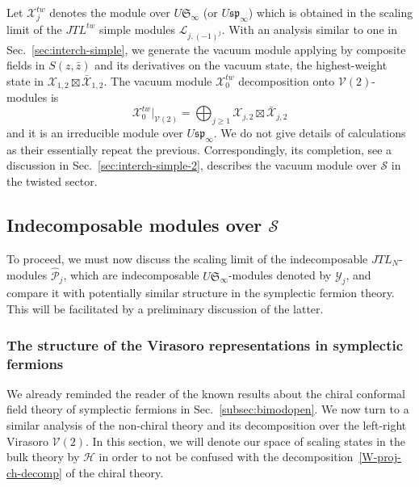 \documentclass[11pt]{article}
\newcommand{\JTL}[1]{JTL_{#1}}
\newcommand{\VirN}{\boldsymbol{\mathcal{V}}}
\newcommand{\interLie}{\mathfrak{S}}
\newcommand{\interchalg}{\mathcal{S}}
\newcommand{\spinf}{\ssp_{\infty}}
\newcommand{\interinfin}{\interLie_{\infty}}
\newcommand{\interM}[1]{\mathscr{X}_{#1}}
\newcommand{\interP}[1]{\mathscr{Y}_{#1}}
\newcommand{\ssp}{\mathfrak{sp}}
\newcommand{\bimnch}{\boldsymbol{\mathcal{H}}}
\newcommand{\bz}{\bar{z}}
\newcommand{\enrg}{S}
\newcommand{\VX}{\mathcal{X}}
\newcommand{\AIrrTL}[2]{\mathscr{L}_{#1,#2}}
\newcommand{\APrTL}[1]{\widehat{\mathscr{P}}_{#1}}
\theoremstyle{definition}
\begin{document}
Let $\interM{j}^{tw}$ denotes the module over
$U\interinfin$ (or $U\spinf$) which is obtained in the scaling limit of the $\JTL{}^{tw}$ simple modules $\AIrrTL{j}{(-1)^{j}}$. With an analysis similar to one in Sec.~\ref{sec:interch-simple}, we generate the vacuum module applying by composite fields in $\enrg(z,\bz)$ and its derivatives on the vacuum state, the highest-weight state in $\VX_{1,2}\boxtimes\bar{\VX}_{1,2}$.  The vacuum module $\interM{0}^{tw}$
 decomposition onto $\VirN(2)$-modules is
\begin{equation}\label{interch-vac-mod-tw}
\interM{0}^{tw}|_{\VirN(2)}  =  \bigoplus_{j\geq1} \VX_{j,2}\boxtimes\bar{\VX}_{j,2}
\end{equation}
and it is an irreducible module over $U\spinf$.
We do not give details of calculations as their essentially repeat the previous. Correspondingly, its completion, see a discussion in Sec.~\ref{sec:interch-simple-2}, describes the vacuum module over $\interchalg$ in the twisted sector.



\subsection{Indecomposable modules over $\interchalg$}\label{sec:indecompmod}

To proceed, we must now discuss the scaling limit of the
indecomposable $\JTL{N}$-modules $\APrTL{j}$, which are indecomposable $U\interinfin$-modules denoted by $\interP{j}$, and compare it with
potentially similar structure in the symplectic fermion theory. This
will be facilitated by a preliminary discussion of the latter.

\subsubsection{The structure of  the Virasoro representations in symplectic fermions}\label{sec:non-chiral-sympl-fer}


We already reminded the reader of the  known results about the chiral conformal
field theory of symplectic fermions in
Sec.~\ref{subsec:bimodopen}. We now turn to a similar analysis of the non-chiral theory and its  decomposition  over the left-right Virasoro $\VirN(2)$.
 In this section, we will denote our space of scaling states in the bulk theory by $\bimnch$ in order to not be confused with the decomposition~\eqref{W-proj-ch-decomp} of the chiral theory.
\end{document}
